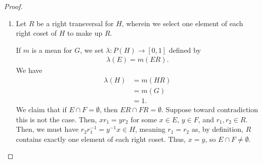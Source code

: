 \documentclass[10pt]{mypackage2}
\begin{document}
\begin{proof}\hfill
  \begin{enumerate}[(1)]
    \item Let $R$ be a right transversal for $H$, wherein we select one element of each right coset of $H$ to make up $R$.\newline

      If $m$ is a mean for $G$, we set $\lambda\colon P(H)\rightarrow [0,1]$ defined by
      \begin{align*}
        \lambda(E) = m\left(ER\right).
      \end{align*}
       We have
      \begin{align*}
        \lambda(H) &= m\left(HR\right)\\
                   &= m\left(G\right)\\
                   &= 1.
      \end{align*}
      We claim that if $E\cap F = \emptyset$, then $ER \cap FR = \emptyset$. Suppose toward contradiction this is not the case. Then, $xr_1 = yr_2$ for some $x\in E$, $y\in F$, and $r_1,r_2\in R$. Then, we must have $r_2r_1^{-1} = y^{-1}x \in H$, meaning $r_1 = r_2$ as, by definition, $R$ contains exactly one element of each right coset. Thus, $x=y$, so $E\cap F \neq \emptyset$.\newline


\end{enumerate}
\end{proof}
\end{document}
